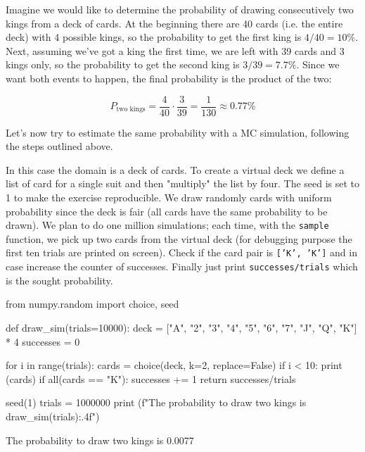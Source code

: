 Imagine we would like to determine the probability of drawing consecutively two kings from a deck of cards. At the beginning there are 40 cards (i.e. the entire deck) with 4 possible kings, so the probability to get the first king is $4/40=10\%$. Next, assuming we've got a king the first time, we are left with 39 cards and 3 kings only, so the probability to get the second king is $3/39=7.7\%$. Since we want both events to happen, the final probability is the product of the two:

\begin{equation*}
P_\textrm{two kings} = \frac{4}{40} \cdot \frac{3}{39} = \frac{1}{130} \approx 0.77\%
\end{equation*}

Let's now try to estimate the same probability with a MC simulation, following the steps outlined above.

In this case the domain is a deck of cards. To create a virtual deck we define a list of card for a single suit and then "multiply" the list by four. The seed is set to 1 to make the exercise reproducible.
We draw randomly cards with uniform probability since the deck is fair (all cards have the same probability to be drawn). 
We plan to do one million simulations; each time, with the \texttt{sample} function, we pick up two cards from the virtual deck (for debugging purpose the first ten trials are printed on screen). Check if the card pair is \texttt{['K', 'K']} and in case increase the counter of successes. Finally just print \texttt{successes/trials} which is the sought probability.

\begin{ipython}
from numpy.random import choice, seed

def draw_sim(trials=10000):
    deck = ["A", "2", "3", "4", "5", "6", "7", "J", "Q", "K"] * 4
    successes = 0

    for i in range(trials):
        cards = choice(deck, k=2, replace=False)
        if i < 10:
            print (cards)
        if all(cards == "K"):
            successes += 1
    return successes/trials
            
seed(1)
trials = 1000000        
print (f"The probability to draw two kings is {draw_sim(trials):.4f}")
\end{ipython}
\begin{ioutput}
['Q', '7']
['5', '7']
['J', '2']
['Q', 'A']
['5', '4']
['7', '2']
['2', '5']
['J', 'Q']
['A', 'Q']
['J', '5']

The probability to draw two kings is 0.0077
\end{ioutput}

